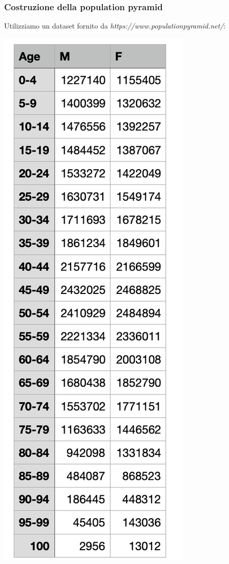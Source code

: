 \documentclass[11pt, oneside]{article}   	%
\begin{document}
\subsubsection{Costruzione della population pyramid}
Utilizziamo un dataset fornito da \emph{https://www.populationpyramid.net/}:
\begin{center}
\includegraphics[scale=0.6]{popitaly}
\end{center}
\end{document}
